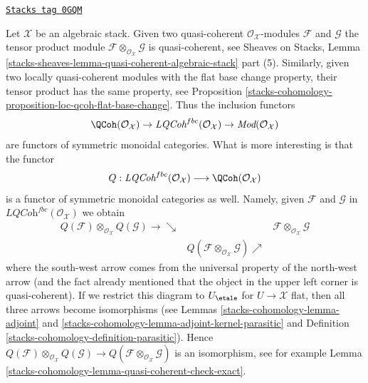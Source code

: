 \begin{remark}
\label{stacks-cohomology-remark-QCoh-tensor}
\href{https://stacks.math.columbia.edu/tag/0GQM}{\texttt{Stacks tag 0GQM}}

Let $\mathcal{X}$ be an algebraic stack. Given two quasi-coherent
$\mathcal{O}_\mathcal{X}$-modules $\mathcal{F}$ and $\mathcal{G}$
the tensor product module
$\mathcal{F} \otimes_{\mathcal{O}_\mathcal{X}} \mathcal{G}$
is quasi-coherent, see Sheaves on Stacks, Lemma
\ref{stacks-sheaves-lemma-quasi-coherent-algebraic-stack} part (5).
Similarly, given two locally quasi-coherent modules with
the flat base change property, their tensor product has the
same property, see Proposition \ref{stacks-cohomology-proposition-loc-qcoh-flat-base-change}.
Thus the inclusion functors
$$
\QCoh(\mathcal{O}_\mathcal{X}) \to
\textit{LQCoh}^{fbc}(\mathcal{O}_\mathcal{X}) \to
\textit{Mod}(\mathcal{O}_\mathcal{X})
$$
are functors of symmetric monoidal categories. What is more interesting
is that the functor
$$
Q :
\textit{LQCoh}^{fbc}(\mathcal{O}_\mathcal{X})
\longrightarrow
\QCoh(\mathcal{O}_\mathcal{X})
$$
is a functor of symmetric monoidal categories as well. Namely, given
$\mathcal{F}$ and $\mathcal{G}$ in
$\textit{LQCoh}^{fbc}(\mathcal{O}_\mathcal{X})$ we obtain
$$
\begin{array}{ccc}Q(\mathcal{F})
\otimes_{\mathcal{O}_\mathcal{X}}
Q(\mathcal{G}) \longrightarrow\searrow &  & \mathcal{F}
\otimes_{\mathcal{O}_\mathcal{X}}
\mathcal{G} \\  & Q(\mathcal{F} \otimes_{\mathcal{O}_\mathcal{X}} \mathcal{G}) \nearrow & \end{array}
$$
where the south-west arrow comes from the universal property
of the north-west arrow (and the fact already mentioned that
the object in the upper left corner is quasi-coherent).
If we restrict this diagram to $U_\etale$ for $U \to \mathcal{X}$
flat, then all three arrows become isomorphisms (see
Lemmas \ref{stacks-cohomology-lemma-adjoint} and \ref{stacks-cohomology-lemma-adjoint-kernel-parasitic}
and Definition \ref{stacks-cohomology-definition-parasitic}).
Hence $Q(\mathcal{F}) \otimes_{\mathcal{O}_\mathcal{X}}
Q(\mathcal{G}) \to
Q(\mathcal{F} \otimes_{\mathcal{O}_\mathcal{X}} \mathcal{G})$
is an isomorphism, see for example
Lemma \ref{stacks-cohomology-lemma-quasi-coherent-check-exact}.
\end{remark}

